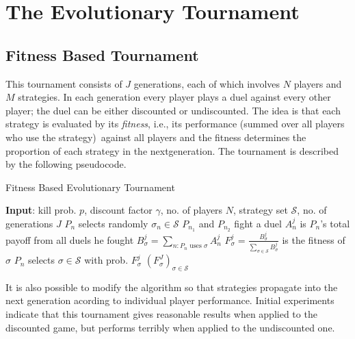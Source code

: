 \documentclass{article}%
\numberwithin{equation}{section}
\begin{document}
\section{The Evolutionary Tournament}

\subsection{Fitness Based Tournament}

This tournament consists of $J$ generations, each of which involves $N$
players and $M$ strategies. In each generation every player plays a duel
against every other player; the duel can be either discounted or undiscounted.
The idea is that each strategy is evaluated by its \emph{fitness}, i.e., its
performance (summed over all players who use the strategy)\ against all
players and the fitness determines the proportion of each strategy in the
nextgeneration. The tournament is described by the following pseudocode.

\begin{algorithm}[h!]
\caption{Fitness Based Evolutionary Tournament}\label{LrngAlg01}
\begin{algorithmic}[1]
\State \textbf{Input}: kill prob. $p$, discount factor $\gamma$, no. of players $N$,
strategy set $\mathcal{S}$, no. of generations $J$
\State $P_n$ selects randomly $\sigma_n\in\mathcal{S}$
\EndFor
{}
\State $P_{n_1}$ and $P_{n_2}$ fight a duel
\EndFor
{}
\State $A^j_n$ is $P_n$'s total payoff from all duels he fought
\EndFor
{}
\State $B^j_\sigma=\sum_{n:P_n \text{ uses }\sigma}A^j_n$
\EndFor
{}
\State $F^j_\sigma=\frac{B^j_\sigma}{\sum_{\sigma\in \mathcal{S}}B^j_\sigma}$ is the fitness of $\sigma$
\EndFor
{}
\State $P_n$ selects $\sigma\in\mathcal{S}$ with prob. $F^j_\sigma$
\EndFor
\EndFor
\State \Return $\left(F^J_\sigma\right)_{\sigma\in \mathcal{S}}$
\end{algorithmic}
\end{algorithm}


\bigskip

\noindent It is also possible to modify the algorithm so that strategies
propagate into the next generation acording to individual player performance.
Initial experiments indicate that this tournament gives reasonable results
when applied to the discounted game, but performs terribly when applied to the
undiscounted one.
\end{document}
